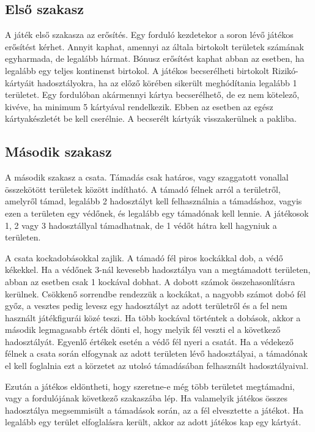 \subsection*{Első szakasz}

A játék első szakasza az erősítés.
Egy forduló kezdetekor a soron lévő játékos erősítést kérhet.
Annyit kaphat, amennyi az általa birtokolt területek számának egyharmada, de legalább hármat.
Bónusz erősítést kaphat abban az esetben, ha legalább egy teljes kontinenst birtokol.
A játékos becserélheti birtokolt Rizikó-kártyáit hadosztályokra, ha az előző körében sikerült meghódítania legalább 1 területet.
Egy fordulóban akármennyi kártya becserélhető, de ez nem kötelező, kivéve, ha minimum 5 kártyával rendelkezik.
Ebben az esetben az egész kártyakészletét be kell cserélnie.
A becserélt kártyák visszakerülnek a pakliba.

\subsection*{Második szakasz}

A második szakasz a csata.
Támadás csak határos, vagy szaggatott vonallal összekötött területek között indítható.
A támadó félnek arról a területről, amelyről támad, legalább 2 hadosztályt kell felhasználnia a támadáshoz, vagyis ezen a területen egy védőnek, és legalább egy támadónak kell lennie.
A játékosok 1, 2 vagy 3 hadosztállyal támadhatnak, de 1 védőt hátra kell hagyniuk a területen.

A csata kockadobásokkal zajlik.
A támadó fél piros kockákkal dob, a védő kékekkel.
Ha a védőnek 3-nál kevesebb hadosztálya van a megtámadott területen, abban az esetben csak 1 kockával dobhat.
A dobott számok összehasonlításra kerülnek.
Csökkenő sorrendbe rendezzük a kockákat, a nagyobb számot dobó fél győz, a vesztes pedig levesz egy hadosztályt az adott területről és a fel nem használt játékfigurái közé teszi.
Ha több kockával történtek a dobások, akkor a második legmagasabb érték dönti el, hogy melyik fél veszti el a következő hadosztályát.
Egyenlő értékek esetén a védő fél nyeri a csatát.
Ha a védekező félnek a csata során elfogynak az adott területen lévő hadosztályai, a támadónak el kell foglalnia ezt a körzetet az utolsó támadásában felhasznált hadosztályaival. 

Ezután a játékos eldöntheti, hogy szeretne-e még több területet megtámadni, vagy a fordulójának következő szakaszába lép.
Ha valamelyik játékos összes hadosztálya megsemmisült a támadások során, az a fél elvesztette a játékot.
Ha legalább egy terület elfoglalásra került, akkor az adott játékos kap egy kártyát.

